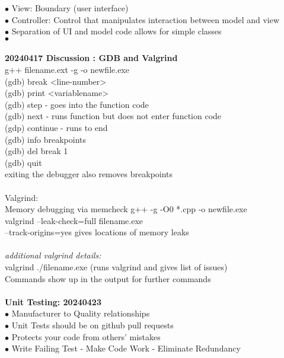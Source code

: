 \documentclass[11pt]{article}
\begin{document}
    \indent\indent $\bullet$ View: Boundary (user interface)\\
    \indent\indent $\bullet$ Controller: Control that manipulates interaction between model and view\\
    \indent\indent $\bullet$ Separation of UI and model code allows for simple classes \\
    \indent $\bullet$ 
    \\ \\
    \textbf{20240417 Discussion : GDB and Valgrind}\\
    g++ filename.ext -g -o newfile.exe\\
    (gdb) break <line-number>\\
    (gdb) print <variablename>\\
    (gdb) step - goes into the function code\\
    (gdb) next - runs function but does not enter function code\\
    (gdp) continue - runs to end\\
    (gdb) info breakpoints\\
    (gdb) del break 1\\
    (gdb) quit\\
    exiting the debugger also removes breakpoints\\
\\
Valgrind:\\
Memory debugging via memcheck
g++ -g -O0 *.cpp -o newfile.exe\\
valgrind --leak-check=full filename.exe\\
--track-origins=yes gives locations of memory leaks\\
\\
\textit{additional valgrind details:}\\
valgrind ./filename.exe (runs valgrind and gives list of issues)\\
Commands show up in the output for further commands\\
\\
\textbf{Unit Testing: 20240423}\\
\indent $\bullet$ Manufacturer to Quality relationships \\
\indent $\bullet$ Unit Tests should be on github pull requests \\
\indent $\bullet$ Protects your code from others' mistakes \\
\indent $\bullet$ Write Failing Test - Make Code Work - Eliminate Redundancy \\
\end{document}
